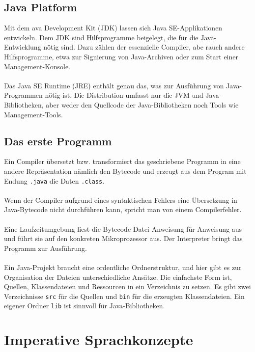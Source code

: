 \subsection{Java Platform}
Mit dem ava Development Kit (JDK) lassen sich Java SE-Applikationen entwickeln. Dem JDK sind Hilfsprogramme beigelegt, die für die Java-Entwicklung nötig sind. Dazu zählen der essenzielle Compiler, abe rauch andere Hilfsprogramme, etwa zur Signierung von Java-Archiven oder zum Start einer Management-Konsole.
\\\\
Das Java SE Runtime (JRE) enthält genau das, was zur Ausführung von Java-Programmen nötig ist. Die Distribution umfasst nur die JVM und Java-Bibliotheken, aber weder den Quellcode der Java-Bibliotheken noch Tools wie Management-Tools.
\subsection{Das erste Programm}
Ein Compiler übersetzt bzw. transformiert das geschriebene Programm in eine andere Repräsentation nämlich den Bytecode und erzeugt aus dem Program mit Endung \texttt{.java} die Daten \texttt{.class}.
\\\\
Wenn der Compiler aufgrund eines syntaktischen Fehlers eine Übersetzung in Java-Bytecode nicht durchführen kann, spricht man von einem Compilerfehler.
\\\\
Eine Laufzeitumgebung liest die Bytecode-Datei Anweisung für Anweisung aus und führt sie auf den konkreten Mikroprozessor aus. Der Interpreter bringt das Programm zur Ausführung.
\\\\
Ein Java-Projekt braucht eine ordentliche Ordnerstruktur, und hier gibt es zur Organisation der Dateien unterschiedliche Ansätze. Die einfachste Form ist, Quellen, Klassendateien und Ressourcen in ein Verzeichnis zu setzen. Es gibt zwei Verzeichnisse \texttt{src} für die Quellen und \texttt{bin} für die erzeugten Klassendateien. Ein eigener Ordner \texttt{lib} ist sinnvoll für Java-Bibliotheken.
\section{Imperative Sprachkonzepte}
